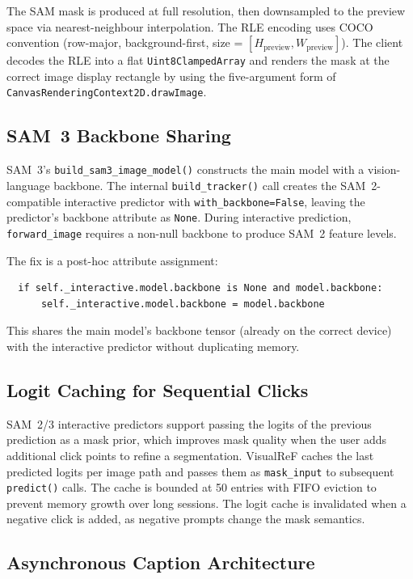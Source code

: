 \documentclass[12pt,a4paper]{article}
\begin{document}
The SAM mask is produced at full resolution, then downsampled to the preview
space via nearest-neighbour interpolation. The RLE encoding uses COCO
convention (row-major, background-first, size = $[H_{\text{preview}}, W_{\text{preview}}]$).
The client decodes the RLE into a flat \texttt{Uint8ClampedArray} and renders
the mask at the correct image display rectangle by using the five-argument
form of \texttt{CanvasRenderingContext2D.drawImage}.

\subsection{SAM~3 Backbone Sharing}

SAM~3's \texttt{build\_sam3\_image\_model()} constructs the main model with a
vision-language backbone. The internal \texttt{build\_tracker()} call creates
the SAM~2-compatible interactive predictor with \texttt{with\_backbone=False},
leaving the predictor's backbone attribute as \texttt{None}. During interactive
prediction, \texttt{forward\_image} requires a non-null backbone to produce
SAM~2 feature levels.

The fix is a post-hoc attribute assignment:
\begin{verbatim}
  if self._interactive.model.backbone is None and model.backbone:
      self._interactive.model.backbone = model.backbone
\end{verbatim}
This shares the main model's backbone tensor (already on the correct device)
with the interactive predictor without duplicating memory.

\subsection{Logit Caching for Sequential Clicks}

SAM~2/3 interactive predictors support passing the logits of the previous
prediction as a mask prior, which improves mask quality when the user adds
additional click points to refine a segmentation. VisualReF caches the
last predicted logits per image path and passes them as \texttt{mask\_input}
to subsequent \texttt{predict()} calls. The cache is bounded at 50 entries
with FIFO eviction to prevent memory growth over long sessions. The logit
cache is invalidated when a negative click is added, as negative prompts
change the mask semantics.

\subsection{Asynchronous Caption Architecture}
\end{document}
